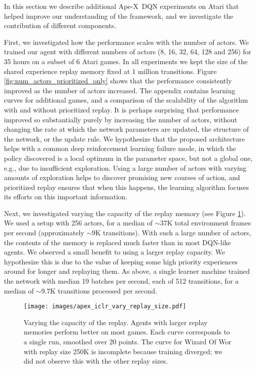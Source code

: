 \documentclass{article} \PassOptionsToPackage{usenames,dvipsnames}{xcolor}
\def\apex{Ape-X}
\def\smallcaption#1{\caption{\small #1}\vspace{-0.4cm}}
\begin{document}
In this section we describe additional \apex\ DQN experiments on Atari that helped improve our understanding of the framework, and we investigate the contribution of different components.

First, we investigated how the performance scales with the number of actors. We trained our agent with different numbers of actors (8, 16, 32, 64, 128 and 256) for 35 hours on a subset of 6 Atari games. In all experiments we kept the size of the shared experience replay memory fixed at 1 million transitions. Figure \ref{fig:num_actors_prioritized_only} shows that the performance consistently improved as the number of actors increased. The appendix contains learning curves for additional games, and a comparison of the scalability of the algorithm with and without prioritized replay. It is perhaps surprising that performance improved so substantially purely by increasing the number of actors, without changing the rate at which the network parameters are updated, the structure of the network, or the update rule. We hypothesize that the proposed architecture helps with a common deep reinforcement learning failure mode, in which the policy discovered is a local optimum in the parameter space, but not a global one, e.g., due to insufficient exploration. Using a large number of actors with varying amounts of exploration helps to discover promising new courses of action, and prioritized replay ensures that when this happens, the learning algorithm focuses its efforts on this important information. 


Next, we investigated varying the capacity of the replay memory (see Figure \ref{fig:vary_replay_size}). We used a setup with 256 actors, for a median of $\sim$37K total environment frames per second (approximately $\sim$9K transitions). With such a large number of actors, the contents of the memory is replaced much faster than in most DQN-like agents. We observed a small benefit to using a larger replay capacity. We hypothesize this is due to the value of keeping some high priority experiences around for longer and replaying them. As above, a single learner machine trained the network with median 19 batches per second, each of 512 transitions, for a median of $\sim$9.7K transitions processed per second.

\begin{figure}
    \centering
    \texttt{[image: images/apex\_iclr\_vary\_replay\_size.pdf]}
    \smallcaption{Varying the capacity of the replay. Agents with larger replay memories perform better on most games. Each curve corresponds to a single run, smoothed over 20 points. The curve for Wizard Of Wor with replay size 250K is incomplete because training diverged; we did not observe this with the other replay sizes.}
    \label{fig:vary_replay_size}
\end{figure}
\end{document}
